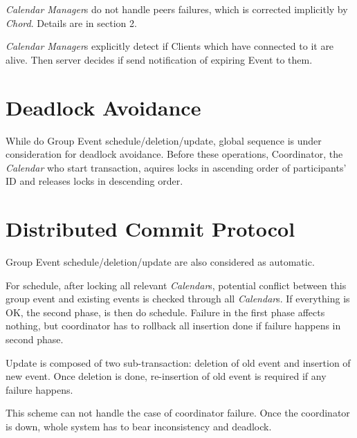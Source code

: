 \documentclass[a4paper, 12pt]{article}
\begin{document}
{\it Calendar Manager}s do not handle peers failures, which is
corrected implicitly by {\it Chord}. Details are in section 2.

{\it Calendar Manager}s explicitly detect if Clients which have
connected to it are alive. Then server decides if send notification of
expiring Event to them.

\section{Deadlock Avoidance}
While do Group Event schedule/deletion/update, global sequence is
under consideration for deadlock avoidance. Before these operations,
Coordinator, the {\it Calendar} who start transaction, aquires locks in
ascending order of participants' ID and releases locks in descending
order. 

\section{Distributed Commit Protocol}
Group Event schedule/deletion/update are also considered as
automatic. 

For schedule, after locking all relevant {\it Calendar}s, potential
conflict between this group event and existing events is checked
through all {\it Calendar}s. If everything is OK, the second phase, is
then do schedule. Failure in the first phase affects nothing, but
coordinator has to rollback all insertion done if failure happens in
second phase. 

Update is composed of two sub-transaction: deletion of old event and
insertion of new event. Once deletion is done, re-insertion of old
event is required if any failure happens. 

This scheme can not handle the case of coordinator failure. Once the
coordinator is down, whole system has to bear inconsistency and
deadlock.
\end{document}
